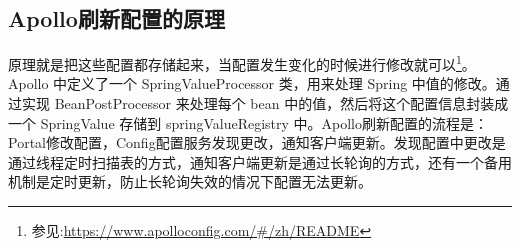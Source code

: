 \documentclass[../../../interview-questions.tex]{subfiles}
\begin{document}
\subsection{Apollo刷新配置的原理}

原理就是把这些配置都存储起来，当配置发生变化的时候进行修改就可以\footnote{参见:\url{https://www.apolloconfig.com/\#/zh/README}}。Apollo 中定义了一个 SpringValueProcessor 类，用来处理 Spring 中值的修改。通过实现 BeanPostProcessor 来处理每个 bean 中的值，然后将这个配置信息封装成一个 SpringValue 存储到 springValueRegistry 中。Apollo刷新配置的流程是：Portal修改配置，Config配置服务发现更改，通知客户端更新。发现配置中更改是通过线程定时扫描表的方式，通知客户端更新是通过长轮询的方式，还有一个备用机制是定时更新，防止长轮询失效的情况下配置无法更新。
\end{document}
